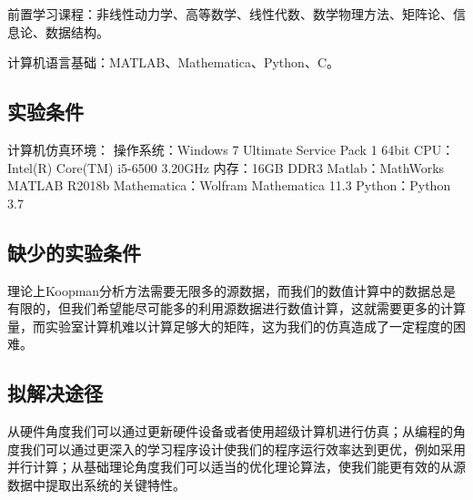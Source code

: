 前置学习课程：非线性动力学、高等数学、线性代数、数学物理方法、矩阵论、信息论、数据结构。

计算机语言基础：MATLAB、Mathematica、Python、C。
\subsection{实验条件}
计算机仿真环境：
操作系统：Windows 7 Ultimate Service Pack 1 64bit
CPU：Intel(R) Core(TM) i5-6500 3.20GHz
内存：16GB DDR3
Matlab：MathWorks MATLAB R2018b
Mathematica：Wolfram Mathematica 11.3
Python：Python 3.7

\subsection{缺少的实验条件}
理论上Koopman分析方法需要无限多的源数据，而我们的数值计算中的数据总是有限的，但我们希望能尽可能多的利用源数据进行数值计算，这就需要更多的计算量，而实验室计算机难以计算足够大的矩阵，这为我们的仿真造成了一定程度的困难。

\subsection{拟解决途径}
从硬件角度我们可以通过更新硬件设备或者使用超级计算机进行仿真；从编程的角度我们可以通过更深入的学习程序设计使我们的程序运行效率达到更优，例如采用并行计算；从基础理论角度我们可以适当的优化理论算法，使我们能更有效的从源数据中提取出系统的关键特性。

% 
% 
